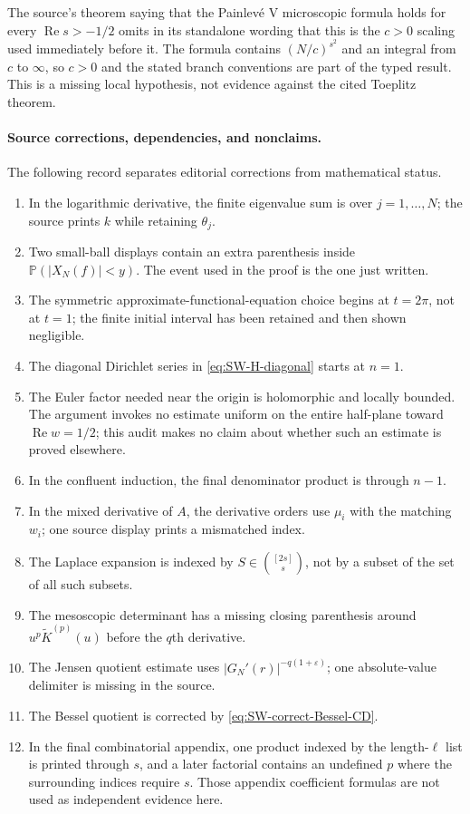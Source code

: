 The source's theorem saying that the Painlev\'e V microscopic formula holds for every
$\operatorname{Re}s>-1/2$ omits in its standalone wording that this is the $c>0$ scaling
used immediately before it.  The formula contains $(N/c)^{s^2}$ and an integral from $c$ to
$\infty$, so $c>0$ and the stated branch conventions are part of the typed result.  This is a
missing local hypothesis, not evidence against the cited Toeplitz theorem.

\paragraph{Source corrections, dependencies, and nonclaims.}
The following record separates editorial corrections from mathematical status.
\begin{enumerate}
  \item In the logarithmic derivative, the finite eigenvalue sum is over $j=1,\ldots,N$;
  the source prints $k$ while retaining $\theta_j$.
  \item Two small-ball displays contain an extra parenthesis inside
  $\mathbb P(|X_N(f)|<y)$.  The event used in the proof is the one just written.
  \item The symmetric approximate-functional-equation choice begins at $t=2\pi$, not at
  $t=1$; the finite initial interval has been retained and then shown negligible.
  \item The diagonal Dirichlet series in \eqref{eq:SW-H-diagonal} starts at $n=1$.
  \item The Euler factor needed near the origin is holomorphic and locally bounded.  The
  argument invokes no estimate uniform on the entire half-plane toward
  $\operatorname{Re}w=1/2$; this audit makes no claim about whether such an estimate is
  proved elsewhere.
  \item In the confluent induction, the final denominator product is through $n-1$.
  \item In the mixed derivative of $A$, the derivative orders use $\mu_i$ with the matching
  $w_i$; one source display prints a mismatched index.
  \item The Laplace expansion is indexed by
  $S\in\binom{[2s]}s$, not by a subset of the set of all such subsets.
  \item The mesoscopic determinant has a missing closing parenthesis around
  $u^p\widetilde K^{(p)}(u)$ before the $q$th derivative.
  \item The Jensen quotient estimate uses $|G_N'(r)|^{-q(1+\varepsilon)}$; one absolute-value
  delimiter is missing in the source.
  \item The Bessel quotient is corrected by \eqref{eq:SW-correct-Bessel-CD}.
  \item In the final combinatorial appendix, one product indexed by the length-$\ell$ list is
  printed through $s$, and a later factorial contains an undefined $p$ where the surrounding
  indices require $s$.  Those appendix coefficient formulas are not used as independent
  evidence here.
\end{enumerate}

